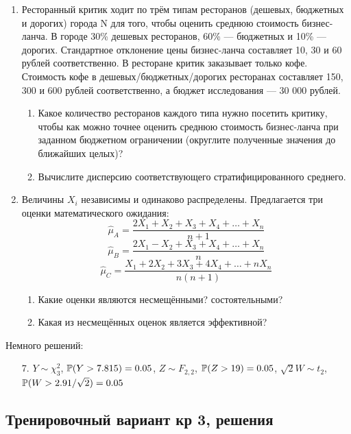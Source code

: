 \documentclass[12pt, a4paper]{article}\usepackage[]{graphicx}\usepackage[]{color}
\begin{document}
\begin{enumerate}
\item Ресторанный критик ходит по трём типам ресторанов (дешевых, бюджетных и дорогих) города N для того, чтобы оценить среднюю стоимость бизнес-ланча. В городе 30\% дешевых ресторанов, 60\% — бюджетных и 10\% — дорогих. Стандартное отклонение цены бизнес-ланча составляет 10, 30 и 60 рублей соответственно. В ресторане критик заказывает только кофе. Стоимость кофе в дешевых/бюджетных/дорогих ресторанах составляет 150, 300 и 600 рублей соответственно, а бюджет исследования — 30 000 рублей.
\begin{enumerate}
\item Какое количество ресторанов каждого типа нужно посетить критику, чтобы как можно точнее оценить среднюю стоимость бизнес-ланча при заданном бюджетном ограничении (округлите полученные значения до ближайших целых)?
\item  Вычислите дисперсию соответствующего стратифицированного среднего.
\end{enumerate}



\item Величины $X_i$ независимы и одинаково распределены. Предлагается три оценки математического ожидания:
\[
\hat \mu_A = \frac{2X_1 + X_2 + X_3 + X_4 +\ldots + X_n}{n+1}
\]
\[
\hat \mu_B = \frac{2X_1 - X_2 + X_3 + X_4 + \ldots + X_n}{n}
\]
\[
\hat \mu_C = \frac{X_1 + 2X_2 + 3X_3 + 4X_4 + \ldots + nX_n}{n(n+1)}
\]

\begin{enumerate}
  \item Какие оценки являются несмещёнными? состоятельными?
  \item Какая из несмещённых оценок является эффективной?
\end{enumerate}
\end{enumerate}

Немного решений:

\begin{enumerate}
\item[7.] $Y \sim \chi^2_3$, $\P(Y>7.815)=0.05$, $Z \sim F_{2,2}$, $\P(Z>19)=0.05$, $\sqrt{2}W \sim t_{2}$, $\P(W > 2.91/\sqrt{2})=0.05$
\end{enumerate}


\subsection{Тренировочный вариант кр 3, решения}
\end{document}
